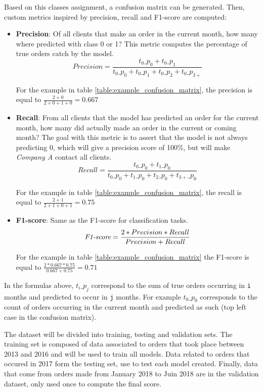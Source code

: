 Based on this classes assignment, a confusion matrix can be generated. Then, custom metrics inspired by precision, recall and F1-score are computed:
\begin{itemize}
    \item \textbf{Precision}: Of all clients that make an order in the current month, how many where predicted with class 0 or 1? This metric computes the percentage of true orders catch by the model. 
    $$ Precision = \frac{t_0\_p_0 + t_0\_p_1}{t_0\_p_0 + t_0\_p_1 + t_0\_p_2 + t_0\_p_{3+}} $$
    
    For the example in table \ref{table:example_confusion_matrix}, the precision is equal to $\frac{2+0}{2+0+1+0} = 0.667$
    
    \item \textbf{Recall}: From all clients that the model has predicted an order for the current month, how many did actually made an order in the current or coming month? The goal with this metric is to assert that the model is not always predicting 0, which will give a precision score of 100\%, but will make \textit{Company A} contact all clients. 
    $$ Recall = \frac{t_0\_p_0 + t_1\_p_0}{t_0\_p_0 + t_1\_p_0 + t_2\_p_0 + t_{3+}\_p_0} $$
    
    For the example in table \ref{table:example_confusion_matrix}, the recall is equal to $\frac{2+1}{2+1+0+1} = 0.75$
    
    \item \textbf{F1-score}: Same as the F1-score for classification tasks. 
    $$ \operatorname{\textit{F1-score}} = \frac{2*Precision*Recall}{Precision+Recall} $$

    For the example in table \ref{table:example_confusion_matrix} the F1-score is equal to $\frac{2*0.667*0.75}{0.667+0.75} = 0.71$
\end{itemize}

In the formulas above, $t_i\_p_j$ correspond to the sum of true orders occurring in \texttt{i} months and predicted to occur in \texttt{j} months. For example $t_0\_p_0$ corresponds to the count of orders occurring in the current month and predicted as such (top left case in the confusion matrix).

The dataset will be divided into training, testing and validation sets. The training set is composed of data associated to orders that took place between 2013 and 2016 and will be used to train all models. Data related to orders that occured in 2017 form the testing set, use to test each model created. Finally, data that come from orders made from January 2018 to Juin 2018 are in the validation dataset, only used once to compute the final score.

